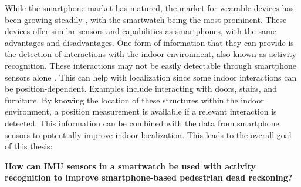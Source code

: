 While the smartphone market has matured, the market for wearable devices has been growing steadily \cite{jung2016consumer}, with the smartwatch being the most prominent. These devices offer similar sensors and capabilities as smartphones, with the same advantages and disadvantages. One form of information that they can provide is the detection of interactions with the indoor environment, also known as activity recognition. These interactions may not be easily detectable through smartphone sensors alone \cite{Shoaib2015}. This can help with localization since some indoor interactions can be position-dependent. Examples include interacting with doors, stairs, and furniture. By knowing the location of these structures within the indoor environment, a position measurement is available if a relevant interaction is detected. This information can be combined with the data from smartphone sensors to potentially improve indoor localization.
This leads to the overall goal of this thesis:

\textbf{How can IMU sensors in a smartwatch be used with activity recognition to improve smartphone-based pedestrian dead reckoning?}




 
